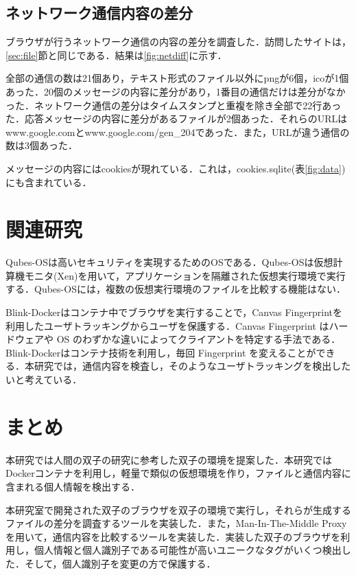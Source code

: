 \documentclass[submit,techrep]{ipsj}
\begin{document}
\begin{itemize}
\label{sec:one}
\subsection{ネットワーク通信内容の差分}
ブラウザが行うネットワーク通信の内容の差分を調査した．訪問したサイトは，\ref{sec:file}節と同じである．結果は\ref{fig:netdiff}に示す．

全部の通信の数は21個あり，テキスト形式のファイル以外にpngが6個，icoが1個あった．20個のメッセージの内容に差分があり，1番目の通信だけは差分がなかった．ネットワーク通信の差分はタイムスタンプと重複を除き全部で22行あった．応答メッセージの内容に差分があるファイルが2個あった．それらのURLはwww.google.comとwww.google.com/gen\_204であった．また，URLが違う通信の数は3個あった．

メッセージの内容にはcookiesが現れている．これは，cookies.sqlite(表\ref{fig:data})にも含まれている．




\section{関連研究}
Qubes-OS\cite{qubes}は高いセキュリティを実現するためのOSである．Qubes-OSは仮想計算機モニタ(Xen)を用いて，アプリケーションを隔離された仮想実行環境で実行する．Qubes-OSには，複数の仮想実行環境のファイルを比較する機能はない．

Blink-Docker\cite{blink}はコンテナ中でブラウザを実行することで，Canvas Fingerprintを利用したユーザトラッキングからユーザを保護する．Canvas Fingerprint はハードウェアや OS のわずかな違いによってクライアントを特定する手法である．Blink-Dockerはコンテナ技術を利用し，毎回 Fingerprint を変えることができる．本研究では，通信内容を検査し，そのようなユーザトラッキングを検出したいと考えている．



\section{まとめ}
本研究では人間の双子の研究に参考した双子の環境を提案した．本研究ではDockerコンテナを利用し，軽量で類似の仮想環境を作り，ファイルと通信内容に含まれる個人情報を検出する．

本研究室で開発された双子のブラウザを双子の環境で実行し，それらが生成するファイルの差分を調査するツールを実装した．また，Man-In-The-Middle Proxyを用いて，通信内容を比較するツールを実装した．実装した双子のブラウザを利用し，個人情報と個人識別子である可能性が高いユニークなタグがいくつ検出した．そして，個人識別子を変更の方で保護する．



\end{itemize}
\end{document}
